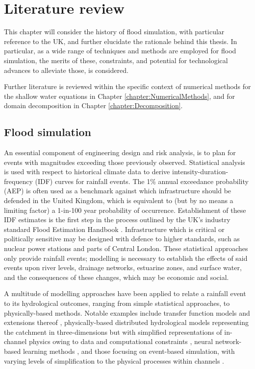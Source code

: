 \chapter{Literature review}
\label{chapter:Background}

This chapter will consider the history of flood simulation, with particular reference to the UK, and further elucidate the rationale behind this thesis. In particular, as a wide range of techniques and methods are employed for flood simulation, the merits of these, constraints, and potential for technological advances to alleviate those, is considered.

Further literature is reviewed within the specific context of numerical methods for the shallow water equations in Chapter \ref{chapter:NumericalMethods}, and for domain decomposition in Chapter \ref{chapter:Decomposition}.

\section{Flood simulation}

An essential component of engineering design and risk analysis, is to plan for events with magnitudes exceeding those previously observed. Statistical analysis is used with respect to historical climate data to derive intensity-duration-frequency (IDF) curves for rainfall events. The 1\% annual exceedance probability (AEP) is often used as a benchmark against which infrastructure should be defended in the United Kingdom, which is equivalent to (but by no means a limiting factor) a 1-in-100 year probability of occurrence. Establishment of these IDF estimates is the first step in the process outlined by the UK's industry standard Flood Estimation Handbook \citep{Faulkner1999}. Infrastructure which is critical or politically sensitive may be designed with defence to higher standards, such as nuclear power stations and parts of Central London. These statistical approaches only provide rainfall events; modelling is necessary to establish the effects of said events upon river levels, drainage networks, estuarine zones, and surface water, and the consequences of these changes, which may be economic and social.

A multitude of modelling approaches have been applied to relate a rainfall event to its hydrological outcomes, ranging from simple statistical approaches, to physically-based methods. Notable examples include transfer function models and extensions thereof \citep[e.g.][]{Moore2007}, physically-based distributed hydrological models representing the catchment in three-dimensions but with simplified representations of in-channel physics owing to data and computational constraints \citep[e.g.][]{Abbott1986}, neural network-based learning methods \citep[e.g.][]{Dawson2001}, and those focusing on event-based simulation, with varying levels of simplification to the physical processes within channels \citep[e.g.][]{Hunter2007}.

